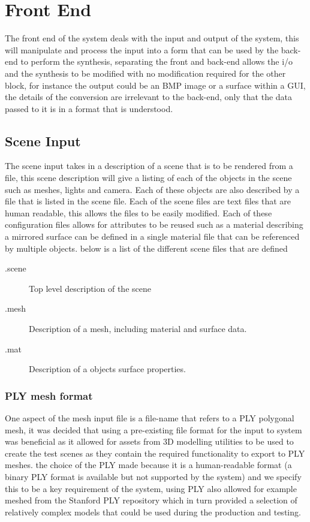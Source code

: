 \section{Front End}
The front end of the system deals with the input and output of the system, this will manipulate and process
the input into a form that can be used by the back-end to perform the synthesis, separating the front and back-end
allows the i/o and the synthesis to be modified with no modification required for the other block,
for instance the output could be an BMP image or a surface within a GUI, the details of the conversion are
irrelevant to the back-end, only that the data passed to it is in a format that is understood.

\subsection{Scene Input}
The scene input takes in a description of a scene that is to be rendered from a file, this scene description
will give a listing of each of the objects in the scene such as meshes, lights and camera. Each of these
objects are also described by a file that is listed in the scene file. Each of the scene files are text files
that are human readable, this allows the files to be easily modified. Each of these configuration files allows
for attributes to be reused such as a material describing a mirrored surface can be defined in a single material
file that can be referenced by multiple objects. below is a list of the different scene files that are defined

\begin{description}
\item[.scene] Top level description of the scene
\item[.mesh] Description of a mesh, including material and surface data.
\item[.mat] Description of a objects surface properties.
\end{description}

\subsubsection{PLY mesh format}
One aspect of the mesh input file is a file-name that refers to a PLY polygonal mesh, it was decided that using
a pre-existing file format for the input to system was beneficial as it allowed for assets from 3D modelling
utilities to be used to create the test scenes as they contain the required functionality to export to PLY
meshes. the choice of the PLY made because it is a human-readable format (a binary PLY format is available but
not supported by the system) and we specify this to be a key requirement of the system, 
using PLY also allowed for example meshed from the Stanford PLY repository which in turn provided a selection of
relatively complex models that could be used during the production and testing.

